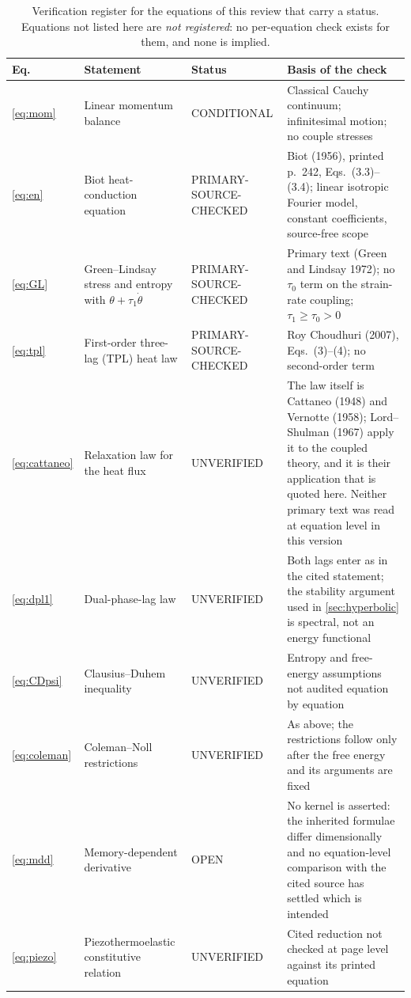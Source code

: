 \begin{table}[H]\centering\small
\caption{Verification register for the equations of this review that carry a status. Equations not listed
here are \emph{not registered}: no per-equation check exists for them, and none is implied.}
\label{tab:eqregister}
\begin{tabularx}{\textwidth}{@{}lY p{2.45cm}Y@{}}
\toprule
\textbf{Eq.} & \textbf{Statement} & \textbf{Status} & \textbf{Basis of the check} \\
\midrule
\eqref{eq:mom} & Linear momentum balance & CONDITIONAL & Classical Cauchy continuum; infinitesimal
  motion; no couple stresses \\
\eqref{eq:en} & Biot heat-conduction equation & PRIMARY-SOURCE-CHECKED & Biot (1956), printed p.~242,
  Eqs.~(3.3)--(3.4); linear isotropic Fourier model, constant coefficients, source-free scope \\
\eqref{eq:GL} & Green--Lindsay stress and entropy with $\theta+\tau_1\dot\theta$ & PRIMARY-SOURCE-CHECKED &
  Primary text (Green and Lindsay 1972); no $\tau_0$ term on the strain-rate coupling;
  $\tau_1\ge\tau_0>0$ \\
\eqref{eq:tpl} & First-order three-lag (TPL) heat law & PRIMARY-SOURCE-CHECKED & Roy Choudhuri (2007),
  Eqs.~(3)--(4); no second-order term \\
\eqref{eq:cattaneo} & Relaxation law for the heat flux & UNVERIFIED & The law itself is Cattaneo (1948) and
  Vernotte (1958); Lord--Shulman (1967) apply it to the coupled theory, and it is their application that is
  quoted here. Neither primary text was read at equation level in this version \\
\eqref{eq:dpl1} & Dual-phase-lag law & UNVERIFIED & Both lags enter as in the cited statement; the
  stability argument used in \cref{sec:hyperbolic} is spectral, not an energy functional \\
\eqref{eq:CDpsi} & Clausius--Duhem inequality & UNVERIFIED & Entropy and free-energy assumptions not
  audited equation by equation \\
\eqref{eq:coleman} & Coleman--Noll restrictions & UNVERIFIED & As above; the restrictions follow only after
  the free energy and its arguments are fixed \\
\eqref{eq:mdd} & Memory-dependent derivative & OPEN & No kernel is asserted: the inherited formulae differ
  dimensionally and no equation-level comparison with the cited source has settled which is intended \\
\eqref{eq:piezo} & Piezothermoelastic constitutive relation & UNVERIFIED & Cited reduction not checked at
  page level against its printed equation \\
\bottomrule
\end{tabularx}
\end{table}

